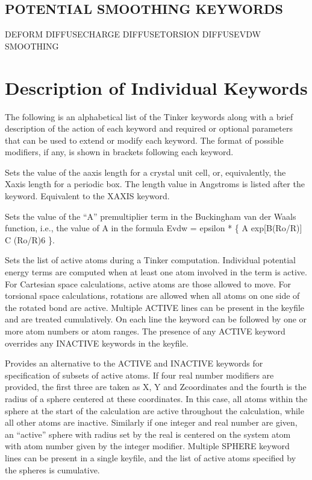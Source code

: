 \documentclass[letterpaper,11pt,english]{sphinxmanual}
\begin{document}
\subsection{POTENTIAL SMOOTHING KEYWORDS}
\label{\detokenize{text/keywords:potential-smoothing-keywords}}
DEFORM  DIFFUSE\sphinxhyphen{}CHARGE  DIFFUSE\sphinxhyphen{}TORSION
DIFFUSE\sphinxhyphen{}VDW     SMOOTHING


\section{Description of Individual Keywords}
\label{\detokenize{text/keywords:description-of-individual-keywords}}
The following is an alphabetical list of the Tinker keywords along with a brief description of the action of each keyword and required or optional parameters that can be used to extend or modify each keyword. The format of possible modifiers, if any, is shown in brackets following each keyword.

  Sets the value of the a\sphinxhyphen{}axis length for a crystal unit cell, or, equivalently, the X\sphinxhyphen{}axis length for a periodic box. The length value in Angstroms is listed after the keyword. Equivalent to the X\sphinxhyphen{}AXIS keyword.

  Sets the value of the “A” premultiplier term in the Buckingham van der Waals function, i.e., the value of A in the formula Evdw = epsilon * \{ A exp{[}\sphinxhyphen{}B(Ro/R){]} \sphinxhyphen{} C (Ro/R)6 \}.

  Sets the list of active atoms during a Tinker computation. Individual potential energy terms are computed when at least one atom involved in the term is active. For Cartesian space calculations, active atoms are those allowed to move. For torsional space calculations, rotations are allowed when all atoms on one side of the rotated bond are active. Multiple ACTIVE lines can be present in the keyfile and are treated cumulatively.  On each line the keyword can be followed by one or more atom numbers or atom ranges. The presence of any ACTIVE keyword overrides any INACTIVE keywords in the keyfile.

  Provides an alternative to the ACTIVE and INACTIVE keywords for specification of subsets of active atoms. If four real number modifiers are provided, the first three are taken as X\sphinxhyphen{}, Y\sphinxhyphen{} and Z\sphinxhyphen{}coordinates and the fourth is the radius of a sphere centered at these coordinates. In this case, all atoms within the sphere at the start of the calculation are active throughout the calculation, while all other atoms are inactive. Similarly if one integer and real number are given, an “active” sphere with radius set by the real is centered on the system atom with atom number given by the integer modifier. Multiple SPHERE keyword lines can be present in a single keyfile, and the list of active atoms specified by the spheres is cumulative.
\end{document}
